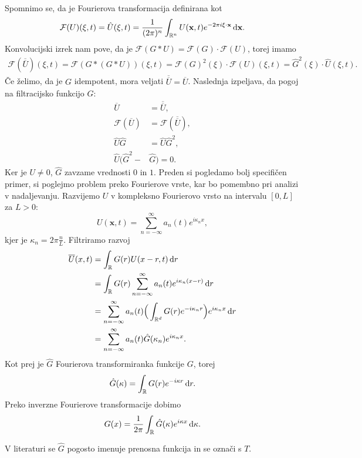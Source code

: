 \documentclass[mat2, tisk]{fmfdelo}
\newcommand{\R}{\mathbb R}
\newcommand{\bd}{\textbf}
\begin{document}
Spomnimo se, da je Fourierova transformacija definirana kot
$$
\mathcal{F}(U)(\bd{\text{$\xi$}}, t) = \hat{U}(\bd{\text{$\xi$}}, t) = \frac{1}{(2\pi)^n} \int_{\R^n} U(\bd{x}, t) e^{-2\pi i\bd{\text{$\xi$}} \cdot \bd{x}} \dif \bd{x}.
$$
Konvolucijski izrek nam pove, da je $\mathcal{F}(G*U) = \mathcal{F}(G) \cdot \mathcal{F}(U)$, torej imamo
\begin{align*}
\mathcal{F}(\overline{\overline{{U}}})(\xi, t) = \mathcal{F}(G*(G*U))(\xi, t) = \mathcal{F}(G)^2(\xi)\cdot\mathcal{F}({U})(\xi, t) = \hat{G}^2(\xi) \cdot \hat{{U}}(\xi, t).
\end{align*}
Če želimo, da je $G$ idempotent, mora veljati $\overline{\overline{{U}}} = \overline{{U}}$. Naslednja izpeljava, da 
pogoj na filtracijsko funkcijo $G$:
\begin{align*}
\overline{{U}} &= \overline{\overline{{U}}}, \\
\mathcal{F}(\overline{{U}}) &= \mathcal{F}(\overline{\overline{{U}}}), \\
\hat{{U}}\hat{G} &= \hat{{U}}\hat{G}^2, \\ 
\hat{U}(\hat{G}^2 - &\hat{G}) = 0.
\end{align*}
Ker je $U \neq 0$, $\hat{G}$ zavzame vrednosti $0$ in $1$. Preden si pogledamo bolj specifičen primer, 
si poglejmo problem preko Fourierove vrste, kar bo pomembno pri analizi v nadaljevanju.
Razvijemo ${U}$  v kompleksno Fourierovo vrsto na intervalu $[0, L]$ za $L > 0$:
\begin{equation*}
{U}(\bd{x}, t) = \sum_{n=-\infty}^\infty a_n(t) e^{i\kappa_n x},
\end{equation*}
kjer je $\kappa_n = 2\pi\frac{n}{L}$. Filtriramo razvoj 
\begin{align*}
\overline{U}(x, t) &= \int_{\R} G(r) U(x - r, t) \dif r \\
&= \int_{\R} G(r) \sum_{n=-\infty}^\infty a_n(t) e^{i\kappa_n (x - r)} \dif r \\
&= \sum_{n=-\infty}^\infty a_n(t)\Big(\int_{\R^d} G(r) e^{-i\kappa_n r}\Big) e^{i\kappa_n x}\dif r \\
&= \sum_{n=-\infty}^\infty a_n(t) \hat{G}(\kappa_n) e^{i\kappa_n x}.
\end{align*}
Kot prej je $\hat{G}$ Fourierova transformiranka funkcije $G$, torej
$$
\hat{G}(\kappa) = \int_{\R} G(r) e^{-i\kappa r} \dif r.
$$
Preko inverzne Fourierove transformacije dobimo
$$
G(x) = \frac{1}{2\pi} \int_{\R} \hat{G}(\kappa) e^{i\kappa x} \dif \kappa.
$$
\begin{opomba}
V literaturi se $\hat{G}$ pogosto imenuje prenosna funkcija in se označi s $T$.
\end{opomba}
\end{document}

